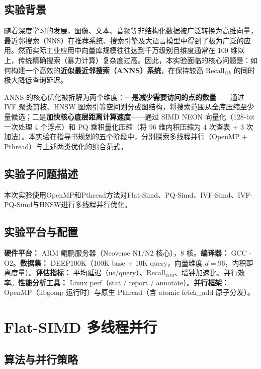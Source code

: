 \documentclass[UTF8,a4paper,10pt]{ctexart}
\begin{document}
\subsection{实验背景}

随着深度学习的发展，图像、文本、音频等非结构化数据被广泛转换为高维向量，最近邻搜索（NNS）在推荐系统、搜索引擎及大语言模型中得到了极为广泛的应用。然而实际工业应用中向量库规模往往达到千万级别且维度通常在 100 维以上，传统精确搜索（暴力计算）复杂度过高。因此，本实验面临的核心问题是：如何构建一个高效的\textbf{近似最近邻搜索（ANNS）系统}，在保持较高 Recall$_{@k}$ 的同时极大降低查询延迟。

ANNS 的核心优化被拆解为两个维度：一是\textbf{减少需要访问的点的数量}——通过 IVF 聚类剪枝、HNSW 图索引等空间划分或图结构，将搜索范围从全库压缩至少量候选；二是\textbf{加快核心底层距离计算速度}——通过 SIMD NEON 向量化（128-bit 一次处理 4 个浮点）和 PQ 乘积量化压缩（将 96 维内积压缩为 4 次查表 + 3 次加法）。本实验在指导书规划的五个阶段中，分别探索多线程并行（OpenMP + Pthread）与上述两类优化的组合范式。
\subsection{实验子问题描述}
本次实验使用OpenMP和Pthread方法对Flat-Simd、PQ-Simd、IVF-Simd、IVF-PQ-Simd与HNSW进行多线程并行优化。
\subsection{实验平台与配置}

\textbf{硬件平台：} ARM 鲲鹏服务器（Neoverse N1/N2 核心），8 核。\textbf{编译器：} GCC -O2。\textbf{数据集：} DEEP100K（100K base + 10K query，向量维度 $d=96$，内积距离度量）。\textbf{评估指标：} 平均延迟（us/query）、Recall$_{@10}$、墙钟加速比、并行效率。\textbf{性能分析工具：} Linux perf（stat / report / annotate）。\textbf{并行框架：} OpenMP（libgomp 运行时）与原生 Pthread（含 atomic fetch\_add 原子分发）。

\section{Flat-SIMD 多线程并行}

\subsection{算法与并行策略}
\end{document}
